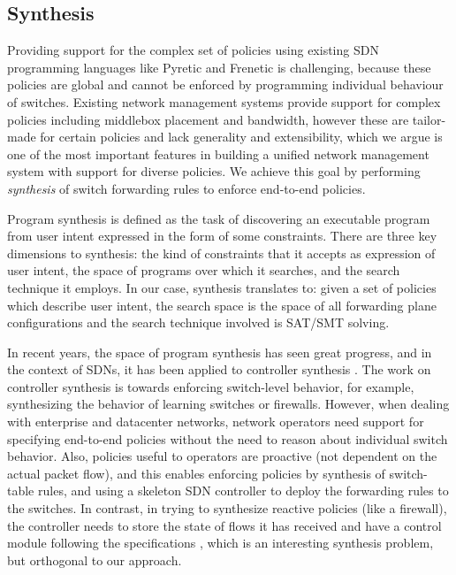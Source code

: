 \subsection{Synthesis} \label{sec:synthesis}
Providing support for the complex set of policies using existing SDN
programming languages like Pyretic and Frenetic is challenging,
because these policies are global and cannot be enforced by
programming individual behaviour of switches. Existing network
management systems provide support for complex policies including
middlebox placement and bandwidth\cite{}, however these are
tailor-made for certain policies and lack generality and
extensibility, which we argue is one of the most important features in
building a unified network management system with support for diverse
policies. We achieve this goal by performing {\em synthesis} of switch
forwarding rules to enforce end-to-end policies.

Program synthesis is defined as the task of discovering an executable
program from user intent expressed in the form of some
constraints. There are three key dimensions to synthesis: the kind of
constraints that it accepts as expression of user intent, the space of
programs over which it searches, and the search technique it
employs. In our case, synthesis translates to: given a set of policies
which describe user intent, the search space is the space of all
forwarding plane configurations and the search technique involved is
SAT/SMT solving.

In recent years, the space of program synthesis has seen great
progress, and in the context of SDNs, it has been applied to
controller synthesis \cite{netegg}. The work on controller synthesis
is towards enforcing switch-level behavior, for example, synthesizing
the behavior of learning switches or firewalls. However, when dealing
with enterprise and datacenter networks, network operators need
support for specifying end-to-end policies without the need to reason
about individual switch behavior. Also, policies useful to operators
are proactive (not dependent on the actual packet flow), and this
enables enforcing policies by synthesis of switch-table rules, and
using a skeleton SDN controller to deploy the forwarding rules to the
switches. In contrast, in trying to synthesize reactive policies (like
a firewall), the controller needs to store the state of flows it has
received and have a control module following the specifications
, which is an interesting
synthesis problem, but orthogonal to our approach.

